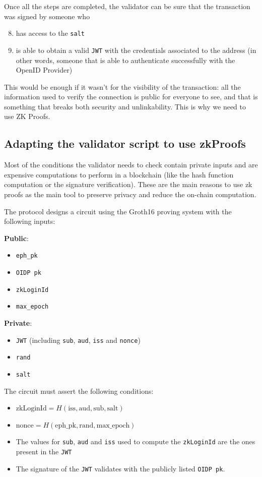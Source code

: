 \documentclass{article}
\begin{document}
Once all the steps are completed, the validator can be sure that the transaction was signed by someone who
\begin{enumerate}
    \setcounter{enumi}{7}
    \item has access to the \texttt{salt}
    \item is able to obtain a valid \texttt{JWT} with the credentials associated to the address (in other words, someone that is able to authenticate successfully with the OpenID Provider)
\end{enumerate}

This would be enough if it wasn't for the visibility of the transaction: all the information used to verify the connection is public for everyone to see, and that is something that breaks both security and unlinkability. This is why we need to use ZK Proofs.

\subsection{Adapting the validator script to use zkProofs}
Most of the conditions the validator needs to check contain private inputs and are expensive computations to perform in a blockchain (like the hash function computation or the signature verification). These are the main reasons to use zk proofs as the main tool to preserve privacy and reduce the on-chain computation.

The protocol designs a circuit using the Groth16 proving system with the following inputs:

\textbf{Public}:
\begin{itemize}
    \item \texttt{eph\_pk}
    \item \texttt{OIDP pk}
    \item \texttt{zkLoginId}
    \item \texttt{max\_epoch}
\end{itemize}

\textbf{Private}:
\begin{itemize}
    \item \texttt{JWT} (including \texttt{sub}, \texttt{aud}, \texttt{iss} and \texttt{nonce})
    \item \texttt{rand}
    \item \texttt{salt}
\end{itemize}

The circuit must assert the following conditions:
\begin{itemize}
    \item $\text{zkLoginId} = H(\text{iss}, \text{aud}, \text{sub}, \text{salt})$
    \item $\text{nonce} = H(\text{eph\_pk}, \text{rand}, \text{max\_epoch})$
    \item The values for \texttt{sub}, \texttt{aud} and \texttt{iss} used to compute the \texttt{zkLoginId} are the ones present in the \texttt{JWT}
    \item The signature of the \texttt{JWT} validates with the publicly listed \texttt{OIDP pk}.
\end{itemize}
\end{document}
